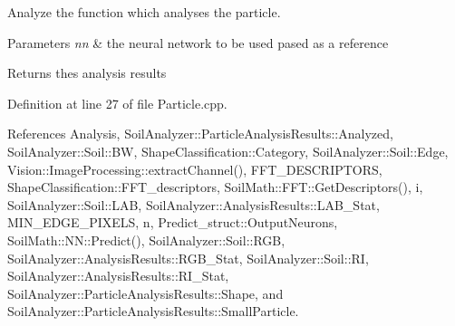 Analyze the function which analyses the particle. 


\begin{DoxyParams}{Parameters}
{\em nn} & the neural network to be used pased as a reference \\
\hline
\end{DoxyParams}
\begin{DoxyReturn}{Returns}
thes analysis results 
\end{DoxyReturn}


Definition at line 27 of file Particle.\+cpp.



References Analysis, Soil\+Analyzer\+::\+Particle\+Analysis\+Results\+::\+Analyzed, Soil\+Analyzer\+::\+Soil\+::\+B\+W, Shape\+Classification\+::\+Category, Soil\+Analyzer\+::\+Soil\+::\+Edge, Vision\+::\+Image\+Processing\+::extract\+Channel(), F\+F\+T\+\_\+\+D\+E\+S\+C\+R\+I\+P\+T\+O\+R\+S, Shape\+Classification\+::\+F\+F\+T\+\_\+descriptors, Soil\+Math\+::\+F\+F\+T\+::\+Get\+Descriptors(), i, Soil\+Analyzer\+::\+Soil\+::\+L\+A\+B, Soil\+Analyzer\+::\+Analysis\+Results\+::\+L\+A\+B\+\_\+\+Stat, M\+I\+N\+\_\+\+E\+D\+G\+E\+\_\+\+P\+I\+X\+E\+L\+S, n, Predict\+\_\+struct\+::\+Output\+Neurons, Soil\+Math\+::\+N\+N\+::\+Predict(), Soil\+Analyzer\+::\+Soil\+::\+R\+G\+B, Soil\+Analyzer\+::\+Analysis\+Results\+::\+R\+G\+B\+\_\+\+Stat, Soil\+Analyzer\+::\+Soil\+::\+R\+I, Soil\+Analyzer\+::\+Analysis\+Results\+::\+R\+I\+\_\+\+Stat, Soil\+Analyzer\+::\+Particle\+Analysis\+Results\+::\+Shape, and Soil\+Analyzer\+::\+Particle\+Analysis\+Results\+::\+Small\+Particle.


